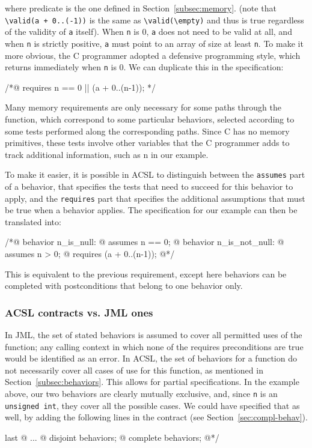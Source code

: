 where predicate \valid is the one defined in Section~\ref{subsec:memory}.
(note that \lstinline|\valid(a + 0..(-1))| is the same as
\lstinline|\valid(\empty)| and thus is true regardless of the validity of
\lstinline|a| itself).
When \lstinline|n| is 0, \lstinline|a| does
not need to be valid at all, and when \lstinline|n| is strictly
positive, \lstinline|a| must point to an array of size at least
\lstinline|n|. To make it more obvious, the C programmer adopted a
defensive programming style, which returns immediately when \lstinline|n| is
0. We can duplicate this in the specification:

\begin{listing-nonumber}
/*@ requires n == 0 || \valid(a + 0..(n-1)); */
\end{listing-nonumber}

Many memory requirements are only necessary for some paths
through the function, which correspond to some particular
behaviors, selected according to some tests performed along the
corresponding paths. Since C has no memory
primitives, these tests involve other variables that the C programmer
adds to track additional information, such as {\ttfamily n} in our example.

To make it easier, it is possible in ACSL to distinguish between the
\lstinline|assumes| part of a behavior, that specifies the tests that need
to succeed for this behavior to apply, and the \lstinline|requires| part
that specifies the additional assumptions that must be true when a
behavior applies. The specification for our example can then be
translated into:

\begin{listing}{1}
/*@ behavior n_is_null:
  @   assumes n == 0;
  @ behavior n_is_not_null:
  @   assumes n > 0;
  @   requires \valid(a + 0..(n-1));
  @*/
\end{listing}

This is equivalent to the previous requirement, except here behaviors
can be completed with postconditions that belong to one behavior only.

\subsubsection*{ACSL contracts vs. JML ones}

In JML, the set of stated behaviors is assumed to cover all
permitted uses of the function; any calling context in which none of the requires preconditions are true would be identified as an error.
In ACSL, the set of behaviors for a function do not
necessarily cover all cases of use for this function, as mentioned in
Section~\ref{subsec:behaviors}. This allows for partial
specifications. In the example above, our two behaviors are clearly mutually exclusive,
and, since \lstinline|n| is an \lstinline|unsigned int|, 
they cover all the possible cases. We could have specified that as well, by
adding the following lines in the contract (see
Section~\ref{sec:compl-behav}).
\begin{listing}{last}
  @ ...
  @ disjoint behaviors;
  @ complete behaviors;
  @*/
\end{listing}

